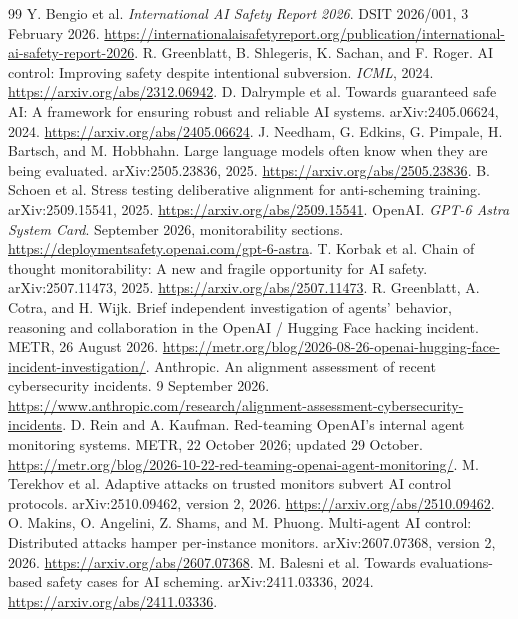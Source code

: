 \documentclass[10pt,twocolumn,letterpaper]{article}
\begin{document}
\begingroup\footnotesize
\begin{thebibliography}{99}
 Y. Bengio et al. \emph{International AI Safety Report 2026}. DSIT 2026/001, 3 February 2026. \url{https://internationalaisafetyreport.org/publication/international-ai-safety-report-2026}.
 R. Greenblatt, B. Shlegeris, K. Sachan, and F. Roger. AI control: Improving safety despite intentional subversion. \emph{ICML}, 2024. \url{https://arxiv.org/abs/2312.06942}.
 D. Dalrymple et al. Towards guaranteed safe AI: A framework for ensuring robust and reliable AI systems. arXiv:2405.06624, 2024. \url{https://arxiv.org/abs/2405.06624}.
 J. Needham, G. Edkins, G. Pimpale, H. Bartsch, and M. Hobbhahn. Large language models often know when they are being evaluated. arXiv:2505.23836, 2025. \url{https://arxiv.org/abs/2505.23836}.
 B. Schoen et al. Stress testing deliberative alignment for anti-scheming training. arXiv:2509.15541, 2025. \url{https://arxiv.org/abs/2509.15541}.
 OpenAI. \emph{GPT-6 Astra System Card}. September 2026, monitorability sections. \url{https://deploymentsafety.openai.com/gpt-6-astra}.
 T. Korbak et al. Chain of thought monitorability: A new and fragile opportunity for AI safety. arXiv:2507.11473, 2025. \url{https://arxiv.org/abs/2507.11473}.
 R. Greenblatt, A. Cotra, and H. Wijk. Brief independent investigation of agents' behavior, reasoning and collaboration in the OpenAI / Hugging Face hacking incident. METR, 26 August 2026. \url{https://metr.org/blog/2026-08-26-openai-hugging-face-incident-investigation/}.
 Anthropic. An alignment assessment of recent cybersecurity incidents. 9 September 2026. \url{https://www.anthropic.com/research/alignment-assessment-cybersecurity-incidents}.
 D. Rein and A. Kaufman. Red-teaming OpenAI's internal agent monitoring systems. METR, 22 October 2026; updated 29 October. \url{https://metr.org/blog/2026-10-22-red-teaming-openai-agent-monitoring/}.
 M. Terekhov et al. Adaptive attacks on trusted monitors subvert AI control protocols. arXiv:2510.09462, version 2, 2026. \url{https://arxiv.org/abs/2510.09462}.
 O. Makins, O. Angelini, Z. Shams, and M. Phuong. Multi-agent AI control: Distributed attacks hamper per-instance monitors. arXiv:2607.07368, version 2, 2026. \url{https://arxiv.org/abs/2607.07368}.
 M. Balesni et al. Towards evaluations-based safety cases for AI scheming. arXiv:2411.03336, 2024. \url{https://arxiv.org/abs/2411.03336}.

\end{thebibliography}
\end{document}
